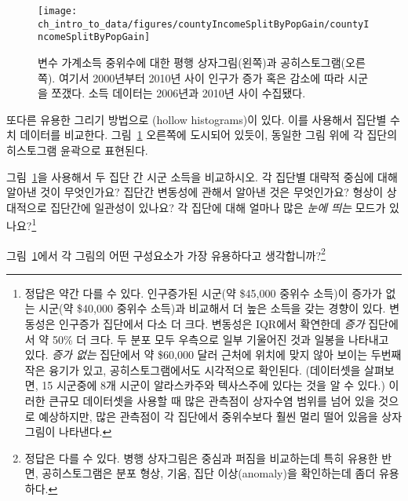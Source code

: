 \begin{figure}
   \centering
   \texttt{[image: ch\_intro\_to\_data/figures/countyIncomeSplitByPopGain/countyIncomeSplitByPopGain]}
   \caption{ 변수  가계소득 중위수에 대한 평행 상자그림(왼쪽)과 공히스토그램(오른쪽). 여기서 2000년부터 2010년 사이 인구가 증가 혹은 감소에 따라 시군을 쪼갰다. 소득 데이터는 2006년과 2010년 사이 수집됐다.}
   \label{countyIncomeSplitByPopGain}
\end{figure}

또다른 유용한 그리기 방법으로 (hollow histograms)이 있다. 이를 사용해서 집단별 수치 데이터를 비교한다. 그림~\ref{countyIncomeSplitByPopGain} 오른쪽에 도시되어 있듯이, 동일한 그림 위에 각 집단의 히스토그램 윤곽으로 표현된다.

\begin{exercise} \label{comparingPriceByTypeExercise}
그림~\ref{countyIncomeSplitByPopGain}을 사용해서 두 집단 간 시군 소득을 비교하시오. 각 집단별 대략적 중심에 대해 알아낸 것이 무엇인가요? 집단간 변동성에 관해서 알아낸 것은 무엇인가요? 형상이 상대적으로 집단간에 일관성이 있나요? 각 집단에 대해 얼마나 많은 \emph{눈에 띄는} 모드가 있나요?\footnote{정답은 약간 다를 수 있다. 인구증가된 시군(약 \$45,000 중위수 소득)이 증가가 없는 시군(약 \$40,000 중위수 소득)과 비교해서 더 높은 소득을 갖는 경향이 있다. 변동성은 인구증가 집단에서 다소 더 크다. 변동성은 IQR에서 확연한데 \emph{증가} 집단에서 약 50\% 더 크다. 두 분포 모두 우측으로 일부 기울어진 것과 일봉을 나타내고 있다. \emph{증가 없는} 집단에서 약 \$60,000 달러 근처에 위치에 맞지 않아 보이는 두번째 작은 융기가 있고, 공히스토그램에서도 시각적으로 확인된다. (데이터셋을 살펴보면, 15 시군중에 8개 시군이 알라스카주와 텍사스주에 있다는 것을 알 수 있다.) 이러한 큰규모 데이터셋을 사용할 때 많은 관측점이 상자수염 범위를 넘어 있을 것으로 예상하지만, 많은 관측점이 각 집단에서 중위수보다 훨씬 멀리 떨어 있음을 상자그림이 나타낸다.}
\end{exercise}

\begin{exercise}
그림~\ref{countyIncomeSplitByPopGain}에서 각 그림의 어떤 구성요소가 가장 유용하다고 생각합니까?\footnote{정답은 다를 수 있다. 병행 상자그림은 중심과 퍼짐을 비교하는데 특히 유용한 반면, 공히스토그램은 분포 형상, 기움, 집단 이상(anomaly)을 확인하는데 좀더 유용하다.}
\end{exercise}



